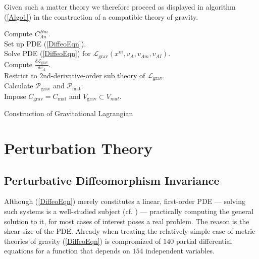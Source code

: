 \documentclass[%
 reprint,
nofootinbib,
 amsmath,amssymb,
 aps,
 prd,
floatfix,
]{revtex4-2}
\begin{document}
Given such a matter theory we therefore proceed as displayed in algorithm (\ref{Algo1}) in the construction of a compatible theory of gravity.
\begin{algorithm}[hbt!]
\SetAlgoLined
{}
Compute $C^{Bm}_{An}$. \\
Set up PDE (\ref{DiffeoEqn}). \\
Solve PDE (\ref{DiffeoEqn}) for $\mathcal{L}_{\text{grav}}(x^m,v_A,v_{Am},v_{AI})$.\\
Compute $\frac{\delta \mathcal{L}_{\text{grav}}}{\delta v_A}$.\\
Restrict to $2$nd-derivative-order sub theory of $\mathcal{L}_{\text{grav}}$.\\
Calculate $\mathcal{P}_{\text{grav}}$ and $\mathcal{P}_{\text{mat}}$.\\
Impose $C_{\text{grav}} = C_{\text{mat}}$ and $V_{\text{grav}} \subset V_{mat}.$
 \caption{Construction of Gravitational Lagrangian}\label{Algo1}
\end{algorithm}
\section{Perturbation Theory}\label{chapter2}
\subsection{Perturbative Diffeomorphism Invariance}
Although (\ref{DiffeoEqn}) merely constitutes a linear, first-order PDE --- solving such systems is a well-studied subject (cf. \cite{Hilbert}) --- practically computing the general solution to it, for most cases of interest poses a real problem. The reason is the shear size of the PDE. Already when treating the relatively simple case of metric theories of gravity (\ref{DiffeoEqn}) is compromized of $140$ partial differential equations for a function that depends on $154$ independent variables.
\end{document}

